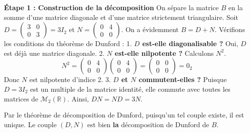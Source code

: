 \documentclass[11pt,a4paper]{article}
\begin{document}
\textbf{Étape 1 : Construction de la décomposition}
On sépare la matrice $B$ en la somme d'une matrice diagonale et d'une matrice strictement triangulaire.
Soit $D = \begin{pmatrix} 3 & 0 \\ 0 & 3 \end{pmatrix} = 3I_2$ et $N = \begin{pmatrix} 0 & 4 \\ 0 & 0 \end{pmatrix}$.
On a évidemment $B = D + N$.
Vérifions les conditions du théorème de Dunford :
1. \textbf{$D$ est-elle diagonalisable ?} Oui, $D$ est déjà une matrice diagonale.
2. \textbf{$N$ est-elle nilpotente ?} Calculons $N^2$.
   $$ N^2 = \begin{pmatrix} 0 & 4 \\ 0 & 0 \end{pmatrix} \begin{pmatrix} 0 & 4 \\ 0 & 0 \end{pmatrix} = \begin{pmatrix} 0 & 0 \\ 0 & 0 \end{pmatrix} = 0_2 $$
   Donc $N$ est nilpotente d'indice 2.
3. \textbf{$D$ et $N$ commutent-elles ?}
   Puisque $D = 3I_2$ est un multiple de la matrice identité, elle commute avec toutes les matrices de $\mathcal{M}_2(\mathbb{R})$.
   Ainsi, $DN = ND = 3N$.

Par le théorème de décomposition de Dunford, puisqu'un tel couple existe, il est unique. Le couple $(D, N)$ est bien \textbf{la} décomposition de Dunford de $B$.
\end{document}
